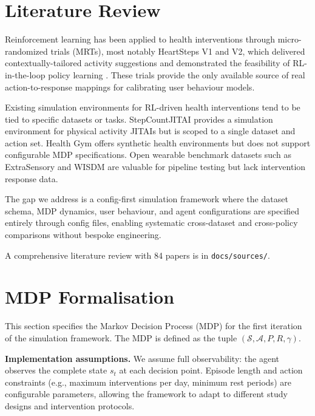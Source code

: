 \documentclass[11pt,a4paper]{article}
\begin{document}
\section{Literature Review}
\label{sec:lit}

Reinforcement learning has been applied to health interventions through
micro-randomized trials (MRTs), most notably HeartSteps V1 and V2, which
delivered contextually-tailored activity suggestions and demonstrated the
feasibility of RL-in-the-loop policy learning \cite{klasnja2019heartsteps,
klasnja2022heartsteps}. These trials provide the only available source of
real action-to-response mappings for calibrating user behaviour models.

Existing simulation environments for RL-driven health interventions tend to
be tied to specific datasets or tasks. StepCountJITAI \cite{karine2024stepcountjitai}
provides a simulation environment for physical activity JITAIs but is scoped
to a single dataset and action set. Health Gym \cite{gateno2023healthgym}
offers synthetic health environments but does not support configurable MDP
specifications. Open wearable benchmark datasets such as ExtraSensory
\cite{vaizman2017extrasensory} and WISDM \cite{kwapisz2011wisdm} are
valuable for pipeline testing but lack intervention response data.

The gap we address is a config-first simulation framework where the dataset
schema, MDP dynamics, user behaviour, and agent configurations are specified
entirely through config files, enabling systematic cross-dataset and
cross-policy comparisons without bespoke engineering.

A comprehensive literature review with 84 papers is in \texttt{docs/sources/}.

\section{MDP Formalisation}
\label{sec:mdp}

This section specifies the Markov Decision Process (MDP) for the first
iteration of the simulation framework. The MDP is defined as the tuple
$(\mathcal{S}, \mathcal{A}, P, R, \gamma)$.

\textbf{Implementation assumptions.} We assume full observability: the agent observes the complete state $s_t$ at each decision point. Episode length and action constraints (e.g., maximum interventions per day, minimum rest periods) are configurable parameters, allowing the framework to adapt to different study designs and intervention protocols.
\end{document}
